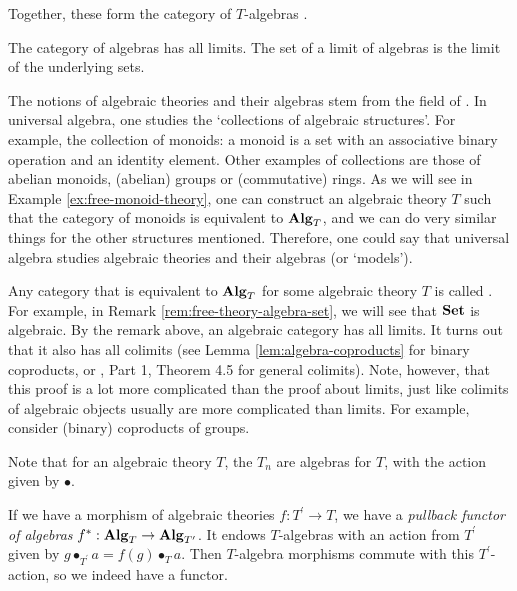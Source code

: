 Together, these form the category of $ T $-algebras .

\begin{remark}
  The category of algebras has all limits. The set of a limit of algebras is the limit of the underlying sets.
\end{remark}

\begin{remark}
  The notions of algebraic theories and their algebras stem from the field of . In universal algebra, one studies the `collections of algebraic structures'. For example, the collection of monoids: a monoid is a set with an associative binary operation and an identity element. Other examples of collections are those of abelian monoids, (abelian) groups or (commutative) rings. As we will see in Example \ref{ex:free-monoid-theory}, one can construct an algebraic theory $ T $ such that the category of monoids is equivalent to $ \mathbf{Alg}_{T} $, and we can do very similar things for the other structures mentioned. Therefore, one could say that universal algebra studies algebraic theories and their algebras (or `models').

  Any category that is equivalent to $ \mathbf{Alg}_{T} $ for some algebraic theory $ T $ is called . For example, in Remark \ref{rem:free-theory-algebra-set}, we will see that $ \mathbf{Set} $ is algebraic. By the remark above, an algebraic category has all limits. It turns out that it also has all colimits (see Lemma \ref{lem:algebra-coproducts} for binary coproducts, or \autocite{algebraic-theories-2010}, Part 1, Theorem 4.5 for general colimits). Note, however, that this proof is a lot more complicated than the proof about limits, just like colimits of algebraic objects usually are more complicated than limits. For example, consider (binary) coproducts of groups.
\end{remark}

\begin{remark}
  Note that for an algebraic theory $ T $, the $ T_n $ are algebras for $ T $, with the action given by $ \bullet $.
\end{remark}

\begin{definition}\label{def:algebra-pullback}
  If we have a morphism of algebraic theories $ f: T^\prime \to T $, we have a \textit{pullback functor of algebras} $ f^* : \mathbf{Alg}_{T} \to \mathbf{Alg}_{T^\prime} $. It endows $ T $-algebras with an action from $ T^\prime $ given by $ g \bullet_{T^\prime} a = f(g) \bullet_T a $. Then $ T $-algebra morphisms commute with this $ T^\prime $-action, so we indeed have a functor.
\end{definition}

